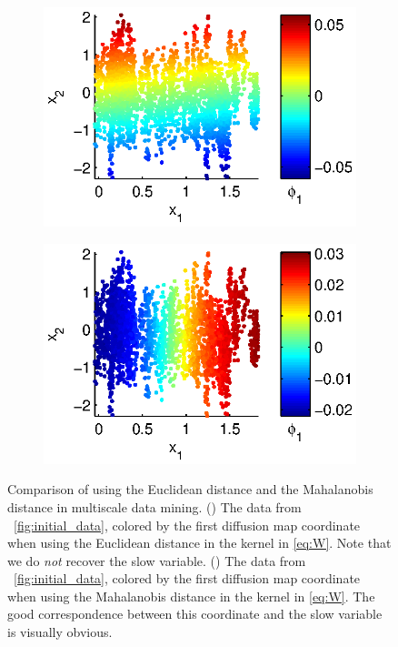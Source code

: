 \begin{figure}[t]
\centering
\begin{subfigure}{0.45\textwidth}
\centering
\includegraphics[width=\textwidth]{data_linear_DMAPS}
\caption{}
\label{subfig:NIV_versus_DMAPS1}
\end{subfigure}
\begin{subfigure}{0.45\textwidth}
\centering
\includegraphics[width=\textwidth]{data_linear_NIV}
\caption{}
\label{subfig:NIV_versus_DMAPS2}
\end{subfigure}
%
\caption[Comparison of using the Euclidean distance and the Mahalanobis distance in analysis of multiscale data]{Comparison of using the Euclidean distance and the Mahalanobis distance in multiscale data mining. () The data from \fig~\ref{fig:initial_data}, colored by the first diffusion map coordinate when using the Euclidean distance in the kernel in \eqref{eq:W}. Note that we do {\em not} recover the slow variable. () The data from \fig~\ref{fig:initial_data}, colored by the first diffusion map coordinate when using the Mahalanobis distance in the kernel in \eqref{eq:W}. The good correspondence between this coordinate and the slow variable is visually obvious.}
\label{fig:NIV_versus_DMAPS}
\end{figure}

